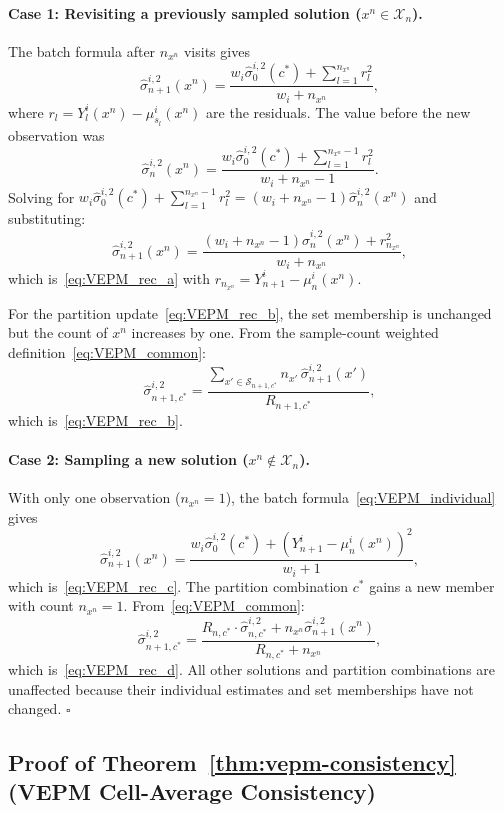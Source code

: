 \documentclass[12pt]{article}
\theoremstyle{plain}
\theoremstyle{definition}
\theoremstyle{remark}
\begin{document}
\paragraph{Case 1: Revisiting a previously sampled solution ($x^n \in \mathcal{X}_n$).}
The batch formula after $n_{x^n}$ visits gives
\[
  \hat{\sigma}^{i,2}_{n+1}(x^n)
  = \frac{w_i \hat{\sigma}^{i,2}_0(c^*) + \sum_{l=1}^{n_{x^n}} r_l^2}{w_i + n_{x^n}},
\]
where $r_l = Y^i_l(x^n) - \mu^i_{s_l}(x^n)$ are the residuals.
The value before the new observation was
\[
  \hat{\sigma}^{i,2}_{n}(x^n)
  = \frac{w_i \hat{\sigma}^{i,2}_0(c^*) + \sum_{l=1}^{n_{x^n}-1} r_l^2}{w_i + n_{x^n}-1}.
\]
Solving for $w_i \hat{\sigma}^{i,2}_0(c^*) + \sum_{l=1}^{n_{x^n}-1} r_l^2
= (w_i + n_{x^n} - 1)\hat{\sigma}^{i,2}_n(x^n)$ and substituting:
\[
  \hat{\sigma}^{i,2}_{n+1}(x^n)
  = \frac{(w_i + n_{x^n}-1)\hat{\sigma}^{i,2}_n(x^n) + r_{n_{x^n}}^2}{w_i + n_{x^n}},
\]
which is~\eqref{eq:VEPM_rec_a} with $r_{n_{x^n}} = Y^i_{n+1} - \mu^i_n(x^n)$.

For the partition update~\eqref{eq:VEPM_rec_b}, the set membership is
unchanged but the count of $x^n$ increases by one.  From the
sample-count weighted definition~\eqref{eq:VEPM_common}:
\[
  \hat{\sigma}^{i,2}_{n+1,c^*}
  = \frac{\sum_{x' \in \mathcal{S}_{n+1,c^*}}
           n_{x'}\,\hat{\sigma}^{i,2}_{n+1}(x')}
          {R_{n+1,c^*}},
\]
which is~\eqref{eq:VEPM_rec_b}.

\paragraph{Case 2: Sampling a new solution ($x^n \notin \mathcal{X}_n$).}
With only one observation ($n_{x^n}=1$), the batch formula~\eqref{eq:VEPM_individual} gives
\[
  \hat{\sigma}^{i,2}_{n+1}(x^n)
  = \frac{w_i \hat{\sigma}^{i,2}_0(c^*) + (Y^i_{n+1} - \mu^i_n(x^n))^2}{w_i + 1},
\]
which is~\eqref{eq:VEPM_rec_c}.  The partition combination $c^*$ gains a new member
with count $n_{x^n}=1$.  From~\eqref{eq:VEPM_common}:
\[
  \hat{\sigma}^{i,2}_{n+1,c^*}
  = \frac{R_{n,c^*} \cdot \hat{\sigma}^{i,2}_{n,c^*}
          + n_{x^n}\hat{\sigma}^{i,2}_{n+1}(x^n)}
         {R_{n,c^*}+n_{x^n}},
\]
which is~\eqref{eq:VEPM_rec_d}.  All other solutions and partition combinations
are unaffected because their individual estimates and set memberships have not changed.
\hfill$\square$

\subsection{Proof of Theorem~\ref{thm:vepm-consistency} (VEPM Cell-Average Consistency)}\label{app:proof_vepm_consistency}
\end{document}

